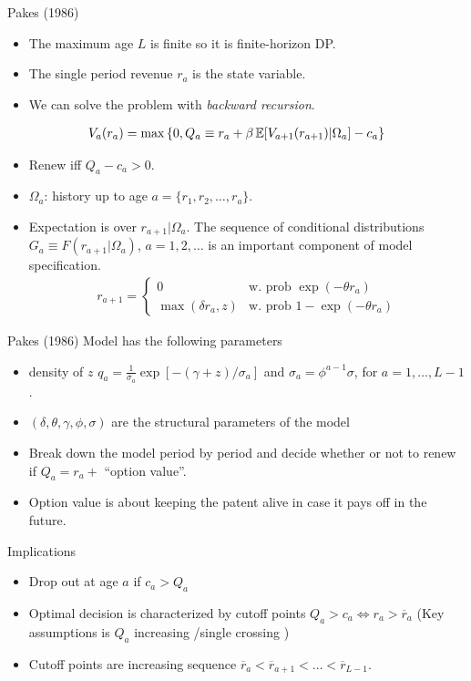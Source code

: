 \begin{frame}{Pakes (1986)}
\begin{itemize}
\item The maximum age $L$ is finite so it is finite-horizon DP.
\item The single period revenue $r_a$ is the state variable.
\item We can solve the problem with \textit{backward recursion}.
\end{itemize}
\begin{align*}
V_a(r_a) = \max  \left\{0, Q_a \equiv r_a + \beta\, \mathbb{E}[V_{a+1} (r_{a+1} ) | \Omega_a] - c_a  \right\}
\end{align*}
\vspace{-0.75cm}
\begin{itemize}
\item Renew iff $Q_a - c_a > 0$.
\item $\Omega_a$: history up to age $a = \{r_1,r_2,\ldots,r_a\}$.
\item Expectation is over $r_{a+1} | \Omega_{a}$. The sequence of conditional distributions $G_a \equiv F(r_{a+1} | \Omega_a)$, $a=1,2,\ldots$ is an important component of model specification.
\begin{align*}
r_{a+1} = \begin{cases} 0  & \mbox{w. prob } \exp(-\theta r_a) \\
\max(\delta r_a,z) & \mbox{w. prob } 1-\exp(-\theta r_a) \end{cases}
\end{align*}
\end{itemize}
\end{frame}


\begin{frame}{Pakes (1986)}
Model has the following parameters
\begin{itemize}
\item density of $z$ $q_a = \frac{1}{\sigma_a} \exp[-(\gamma+z)/\sigma_a]$ and $\sigma_a = \phi^{a-1} \sigma$, for $a=1,\ldots,L-1$. 
\item $(\delta, \theta, \gamma, \phi, \sigma)$ are the structural parameters of the model
\item Break down the model period by period and decide whether or not to renew if $Q_a = r_a + $ ``option value''.
\item Option value is about keeping the patent alive in case it pays off in the future.
\end{itemize}
Implications
\begin{itemize}
\item Drop out at age $a$ if $c_a > Q_a$
\item Optimal decision is characterized by cutoff points $Q_a > c_a \Leftrightarrow r_a > \overline{r}_a$  (Key assumptions is $Q_a$ increasing /single crossing )
\item Cutoff points are increasing sequence $\overline{r}_{a} < \overline{r}_{a+1} < \ldots < \overline{r}_{L-1}$.
\end{itemize}
\end{frame}


